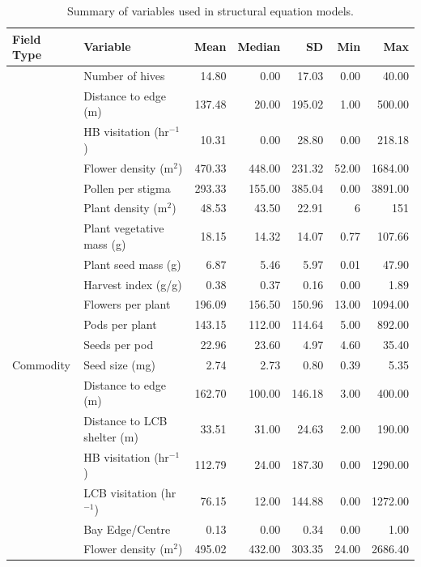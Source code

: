 \documentclass[12pt]{article} %
\begin{document}
\begin{table}[h]
\caption{Summary of variables used in structural equation models.}
\centering
\begin{tabular}{l|l|r|r|r|r|r}
\hline
Field Type & Variable & Mean & Median & SD & Min & Max\\
\hline
 & Number of hives & 14.80 & 0.00 & 17.03 & 0.00 & 40.00\\
\cline{2-7}
 & Distance to edge (m) & 137.48 & 20.00 & 195.02 & 1.00 & 500.00\\
\cline{2-7}
 & HB visitation (hr$^{-1}$) & 10.31 & 0.00 & 28.80 & 0.00 & 218.18\\
\cline{2-7}
 & Flower density (m$^2$) & 470.33 & 448.00 & 231.32 & 52.00 & 1684.00\\
\cline{2-7}
 & Pollen per stigma & 293.33 & 155.00 & 385.04 & 0.00 & 3891.00\\
\cline{2-7}
 & Plant density (m$^2$) & 48.53 & 43.50 & 22.91 & 6 & 151\\
\cline{2-7}
 & Plant vegetative mass (g) & 18.15 & 14.32 & 14.07 & 0.77 & 107.66\\
\cline{2-7}
 & Plant seed mass (g) & 6.87 & 5.46 & 5.97 & 0.01 & 47.90\\
\cline{2-7}
 & Harvest index (g/g) & 0.38 & 0.37 & 0.16 & 0.00 & 1.89\\
\cline{2-7}
 & Flowers per plant & 196.09 & 156.50 & 150.96 & 13.00 & 1094.00\\
\cline{2-7}
 & Pods per plant & 143.15 & 112.00 & 114.64 & 5.00 & 892.00\\
\cline{2-7}
 & Seeds per pod & 22.96 & 23.60 & 4.97 & 4.60 & 35.40\\
\cline{2-7}
\multirow{-13}{*}{\raggedright\arraybackslash Commodity} & Seed size (mg) & 2.74 & 2.73 & 0.80 & 0.39 & 5.35\\
\cline{1-7}
 & Distance to edge (m) & 162.70 & 100.00 & 146.18 & 3.00 & 400.00\\
\cline{2-7}
 & Distance to LCB shelter (m) & 33.51 & 31.00 & 24.63 & 2.00 & 190.00\\
\cline{2-7}
 & HB visitation (hr$^{-1}$) & 112.79 & 24.00 & 187.30 & 0.00 & 1290.00\\
\cline{2-7}
 & LCB visitation (hr$^{-1}$) & 76.15 & 12.00 & 144.88 & 0.00 & 1272.00\\
\cline{2-7}
 & Bay Edge/Centre & 0.13 & 0.00 & 0.34 & 0.00 & 1.00\\
\cline{2-7}
 & Flower density (m$^2$) & 495.02 & 432.00 & 303.35 & 24.00 & 2686.40\\

\end{tabular}
\end{table}
\end{document}
